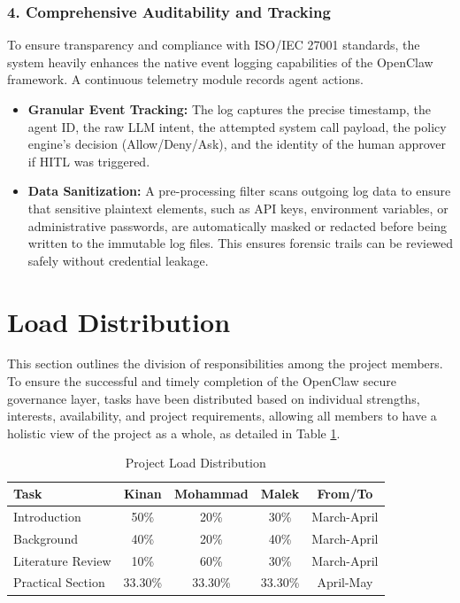 \documentclass[a4paper]{report}
\begin{document}
\subsubsection*{4. Comprehensive Auditability and Tracking}
To ensure transparency and compliance with ISO/IEC 27001 standards, the system heavily enhances the native event logging capabilities of the OpenClaw framework. A continuous telemetry module records agent actions.
\begin{itemize}
    \item \textbf{Granular Event Tracking:} The log captures the precise timestamp, the agent ID, the raw LLM intent, the attempted system call payload, the policy engine's decision (Allow/Deny/Ask), and the identity of the human approver if HITL was triggered.
    \item \textbf{Data Sanitization:} A pre-processing filter scans outgoing log data to ensure that sensitive plaintext elements, such as API keys, environment variables, or administrative passwords, are automatically masked or redacted before being written to the immutable log files. This ensures forensic trails can be reviewed safely without credential leakage.
\end{itemize}

\section{Load Distribution}

This section outlines the division of responsibilities among the project members. To ensure the successful and timely completion of the OpenClaw secure governance layer, tasks have been distributed based on individual strengths, interests, availability, and project requirements, allowing all members to have a holistic view of the project as a whole, as detailed in Table \ref{tab:load_distribution}.

\begin{table}[H]
\centering
\caption{Project Load Distribution}
\label{tab:load_distribution}
\renewcommand{\arraystretch}{1.5} %
\begin{tabular}{|l|c|c|c|c|}
\hline
\textbf{Task} & \textbf{Kinan} & \textbf{Mohammad} & \textbf{Malek} & \textbf{From/To} \\ \hline
Introduction & 50\% & 20\% & 30\% & March-April \\ \hline
Background & 40\% & 20\% & 40\% & March-April \\ \hline
Literature Review & 10\% & 60\% & 30\% & March-April \\ \hline
Practical Section & 33.30\% & 33.30\% & 33.30\% & April-May \\ \hline
\end{tabular}
\end{table}
\end{document}
